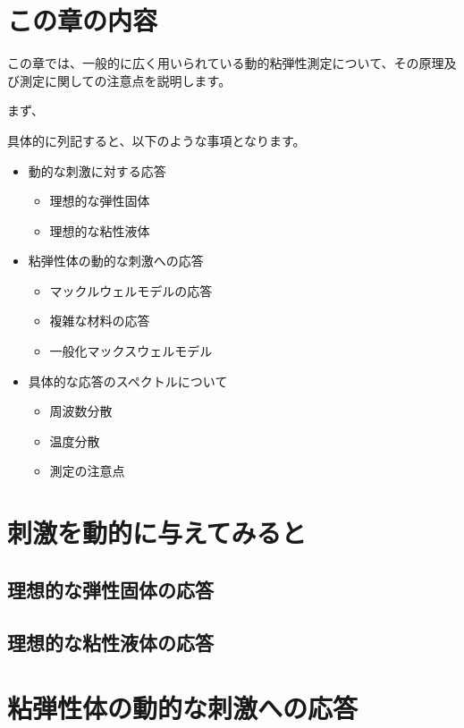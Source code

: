 \documentclass[uplatex,dvipdfmx,a4paper,11pt]{jsarticle}
\begin{document}
\section*{この章の内容}

この章では、⼀般的に広く⽤いられている動的粘弾性測定について、その原理及び測定に関しての注意点を説明します。

まず、

具体的に列記すると、以下のような事項となります。
\begin{boxnote}
    \begin{itemize}
		\item 動的な刺激に対する応答
        \begin{itemize}
			\item 理想的な弾性固体
			\item 理想的な粘性液体
		\end{itemize} 
		\item 粘弾性体の動的な刺激への応答
		\begin{itemize}
			\item マックルウェルモデルの応答
			\item 複雑な材料の応答
			\item 一般化マックスウェルモデル
		\end{itemize} 
		\item 具体的な応答のスペクトルについて
		\begin{itemize}
			\item 周波数分散
			\item 温度分散
			\item 測定の注意点
		\end{itemize}
	\end{itemize}
\end{boxnote}



\section{刺激を動的に与えてみると}
\subsection{理想的な弾性固体の応答}

\subsection{理想的な粘性液体の応答}

\section{粘弾性体の動的な刺激への応答}
\end{document}
